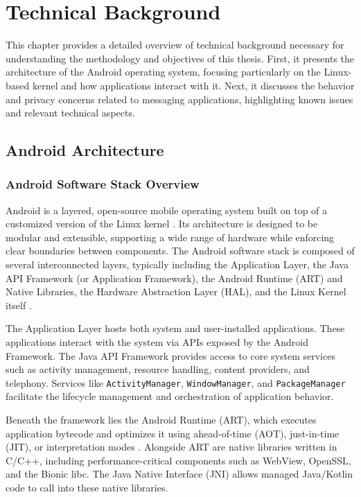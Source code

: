 \documentclass[a4paper,12pt]{report}
\begin{document}
\chapter{Technical Background}

This chapter provides a detailed overview of technical background necessary for understanding the methodology and objectives of this thesis. First, it presents the architecture of the Android operating system, focusing particularly on the Linux-based kernel and how applications interact with it. Next, it discusses the behavior and privacy concerns related to messaging applications, highlighting known issues and relevant technical aspects.

\section{Android Architecture}

\subsection{Android Software Stack Overview}
Android is a layered, open-source mobile operating system built on top of a customized version of the Linux kernel \cite{AOSPArchOverview}. Its architecture is designed to be modular and extensible, supporting a wide range of hardware while enforcing clear boundaries between components. The Android software stack is composed of several interconnected layers, typically including the Application Layer, the Java API Framework (or Application Framework), the Android Runtime (ART) and Native Libraries, the Hardware Abstraction Layer (HAL), and the Linux Kernel itself \cite{tanenbaum2015modern}.

The Application Layer hosts both system and user-installed applications. These applications interact with the system via APIs exposed by the Android Framework. The Java API Framework provides access to core system services such as activity management, resource handling, content providers, and telephony. Services like \texttt{ActivityManager}, \texttt{WindowManager}, and \texttt{PackageManager} facilitate the lifecycle management and orchestration of application behavior.

Beneath the framework lies the Android Runtime (ART), which executes application bytecode and optimizes it using ahead-of-time (AOT), just-in-time (JIT), or interpretation modes \cite{AOSPART}. Alongside ART are native libraries written in C/C++, including performance-critical components such as WebView, OpenSSL, and the Bionic libc. The Java Native Interface (JNI) allows managed Java/Kotlin code to call into these native libraries.
\end{document}
